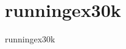 \section{runningex30k}
\label{sec:datasets:runningex30k}
\begin{datasetDescription}{runningex30k}
\end{datasetDescription}

